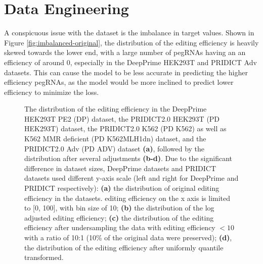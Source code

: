 \section{Data Engineering}
\label{sec:data-engineering}

A conspicuous issue with the dataset is the imbalance in target values. Shown in Figure \ref{fig:imbalanced-original}, the distribution of the editing efficiency is heavily skewed towards the lower end, with a large number of pegRNAs having an an efficiency of around 0, especially in the DeepPrime HEK293T and PRIDICT Adv datasets. This can cause the model to be less accurate in predicting the higher efficiency pegRNAs, as the model would be more inclined to predict lower efficiency to minimize the loss. 

\begin{figure}
    \centering
    \caption[Target Distribution Imbalance]{The distribution of the editing efficiency in the DeepPrime HEK293T PE2 (DP) dataset, the PRIDICT2.0 HEK293T (PD HEK293T) dataset, the PRIDICT2.0 K562 (PD K562) as well as K562 MMR deficient (PD K562MLH1dn) dataset, and the PRIDICT2.0 Adv (PD ADV) dataset \textbf{(a)}, followed by the distribution after several adjustments \textbf{(b-d)}. Due to the significant difference in dataset sizes, DeepPrime datasets and PRIDICT datasets used different y-axis scale (left and right for DeepPrime and PRIDICT respectively): 
    \textbf{(a)} the distribution of original editing efficiency in the datasets. editing efficiency on the x axis is limited to [0, 100], with bin size of 10; \textbf{(b)} the distribution of the log adjusted editing efficiency; \textbf{(c)} the distribution of the editing efficiency after undersampling the data with editing efficiency $<10$ with a ratio of 10:1 (10\% of the original data were preserved); \textbf{(d)}, the distribution of the editing efficiency after uniformly quantile transformed.}
    \label{fig:imbalanced}
\end{figure}

